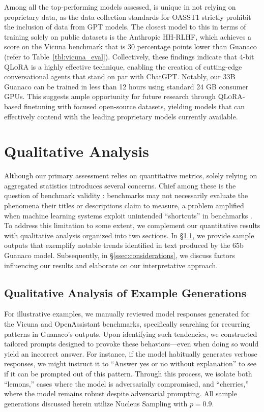 Among all the top-performing models assessed,  is unique in not relying on proprietary data, as the data collection standards for OASST1 strictly prohibit the inclusion of data from GPT models. The closest model to this in terms of training solely on public datasets is the Anthropic HH-RLHF, which achieves a score on the Vicuna benchmark that is 30 percentage points lower than {Guanaco} (refer to Table~\ref{tbl:vicuna_eval}). Collectively, these findings indicate that 4-bit \textsc{QLoRA} is a highly effective technique, enabling the creation of cutting-edge conversational agents that stand on par with ChatGPT. Notably, our 33B {Guanaco} can be trained in less than 12 hours using standard 24 GB consumer GPUs. This suggests ample opportunity for future research through \textsc{QLoRA}-based finetuning with focused open-source datasets, yielding models that can effectively contend with the leading proprietary models currently available.

\section{Qualitative Analysis}

Although our primary assessment relies on quantitative metrics, solely relying on aggregated statistics introduces several concerns. Chief among these is the question of benchmark validity \citep{liao2021we}: benchmarks may not necessarily evaluate the phenomena their titles or descriptions claim to measure, a problem amplified when machine learning systems exploit unintended ``shortcuts'' in benchmarks \citep{gururangan2018annotation, poliak2018hypothesis}. To address this limitation to some extent, we complement our quantitative results with qualitative analysis organized into two sections. In \S\ref{ssec:examples}, we provide sample outputs that exemplify notable trends identified in text produced by the 65b {Guanaco} model. Subsequently, in \S\ref{ssec:considerations}, we discuss factors influencing our results and elaborate on our interpretative approach.

\subsection{Qualitative Analysis of Example Generations}
\label{ssec:examples}

For illustrative examples, we manually reviewed model responses generated for the Vicuna and OpenAssistant benchmarks, specifically searching for recurring patterns in {Guanaco}'s outputs. Upon identifying such tendencies, we constructed tailored prompts designed to provoke these behaviors—even when doing so would yield an incorrect answer. For instance, if the model habitually generates verbose responses, we might instruct it to ``Answer yes or no without explanation'' to see if it can be prompted out of this pattern. Through this process, we isolate both ``lemons,'' cases where the model is adversarially compromised, and ``cherries,'' where the model remains robust despite adversarial prompting. All sample generations discussed herein utilize Nucleus Sampling \cite{holtzmancurious} with $p=0.9$.

